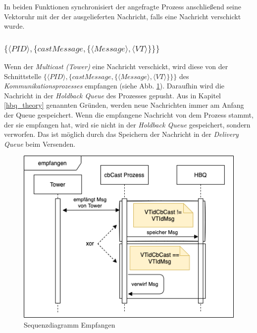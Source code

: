In beiden Funktionen synchronisiert der angefragte Prozess anschließend seine Vektoruhr mit der der ausgelieferten Nachricht, falls eine Nachricht verschickt wurde.

\subsubsection{$\{\langle PID \rangle,\{castMessage,\{\langle Message \rangle, \langle VT \rangle\}\}\}$}

Wenn der \textit{Multicast (Tower)} eine Nachricht verschickt, wird diese von der Schnittstelle $\{\langle PID \rangle,\{castMessage,\{\langle Message \rangle, \langle VT \rangle\}\}\}$ des \textit{Kommunikationsprozesses} empfangen (siehe Abb. \ref{fig:sequence_cbCast_cbcast}). Daraufhin wird die Nachricht in der \textit{Holdback Queue} des Prozesses gepusht. Aus in  Kapitel \ref{hbq_theory} genannten Gründen, werden neue Nachrichten immer am Anfang der Queue gespeichert. Wenn die empfangene Nachricht von dem Prozess stammt, der sie empfangen hat, wird sie nicht in der \textit{Holdback Queue} gespeichert, sondern verworfen. Das ist möglich durch das Speichern der Nachricht in der \textit{Delivery Queue} beim Versenden.

\begin{figure}[htbp]
\begin{center}
\includegraphics[scale=0.5]{Latex/Bilder/Sequenz_empfangen.png}
\caption{\label{fig:sequence_cbCast_cbcast} Sequenzdiagramm Empfangen}
\end{center}
\end{figure}

